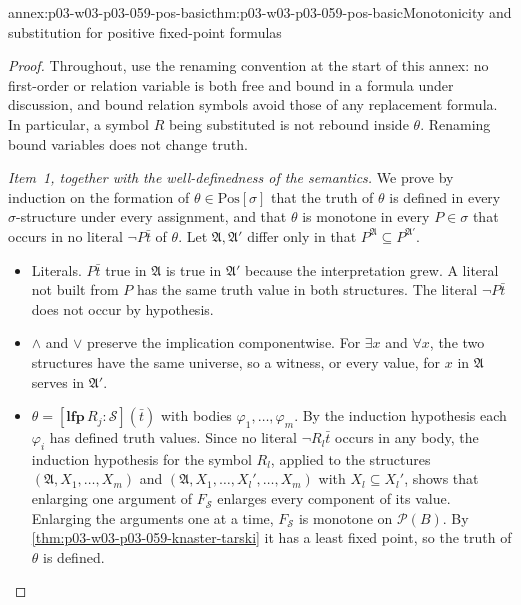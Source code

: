 \begin{annexitem}{annex:p03-w03-p03-059-pos-basic}{thm:p03-w03-p03-059-pos-basic}{Monotonicity and substitution for positive fixed-point formulas}
\begin{proof}
Throughout, use the renaming convention at the start of this annex:
no first-order or relation variable is both free and bound in a formula
under discussion, and bound relation symbols avoid those of any replacement
formula. In particular, a symbol \(R\) being substituted is not rebound
inside \(\theta\). Renaming bound variables does not change truth.

\emph{Item~1, together with the well-definedness of the semantics.} We
prove by induction on the formation of \(\theta\in\mathrm{Pos}[\sigma]\)
that the truth of \(\theta\) is defined in every \(\sigma\)-structure under
every assignment, and that \(\theta\) is monotone in every \(P\in\sigma\)
that occurs in no literal \(\neg P\bar t\) of \(\theta\). Let
\(\mathfrak A,\mathfrak A'\) differ only in that
\(P^{\mathfrak A}\subseteq P^{\mathfrak A'}\).
\begin{itemize}
 \item Literals. \(P\bar t\) true in \(\mathfrak A\) is true in
       \(\mathfrak A'\) because the interpretation grew. A literal not
       built from \(P\) has the same truth value in both structures. The
       literal \(\neg P\bar t\) does not occur by hypothesis.
 \item \(\land\) and \(\lor\) preserve the implication componentwise. For
       \(\exists x\) and \(\forall x\), the two structures have the same
       universe, so a witness, or every value, for \(x\) in \(\mathfrak A\)
       serves in \(\mathfrak A'\).
 \item \(\theta=[\mathbf{lfp}\,R_j:\mathcal S](\bar t)\) with bodies
       \(\varphi_1,\ldots,\varphi_m\). By the induction hypothesis each
       \(\varphi_i\) has defined truth values. Since no literal
       \(\neg R_l\bar t\) occurs in any body, the induction hypothesis for
       the symbol \(R_l\), applied to the structures
       \((\mathfrak A,X_1,\ldots,X_m)\) and
       \((\mathfrak A,X_1,\ldots,X_l',\ldots,X_m)\) with
       \(X_l\subseteq X_l'\), shows that enlarging one argument of
       \(F_{\mathcal S}\) enlarges every component of its value. Enlarging
       the arguments one at a time, \(F_{\mathcal S}\) is monotone on
       \(\mathcal P(B)\). By \cref{thm:p03-w03-p03-059-knaster-tarski} it
       has a least fixed point, so the truth of \(\theta\) is defined.


\end{itemize}
\end{proof}
\end{annexitem}
